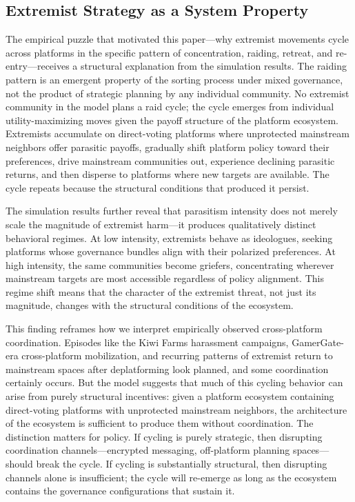 \documentclass{article}
\begin{document}
\subsection{Extremist Strategy as a System Property}

The empirical puzzle that motivated this paper---why extremist movements cycle across platforms in the specific pattern of concentration, raiding, retreat, and re-entry---receives a structural explanation from the simulation results. The raiding pattern is an emergent property of the sorting process under mixed governance, not the product of strategic planning by any individual community. No extremist community in the model plans a raid cycle; the cycle emerges from individual utility-maximizing moves given the payoff structure of the platform ecosystem. Extremists accumulate on direct-voting platforms where unprotected mainstream neighbors offer parasitic payoffs, gradually shift platform policy toward their preferences, drive mainstream communities out, experience declining parasitic returns, and then disperse to platforms where new targets are available. The cycle repeats because the structural conditions that produced it persist.

The simulation results further reveal that parasitism intensity does not merely scale the magnitude of extremist harm---it produces qualitatively distinct behavioral regimes. At low intensity, extremists behave as ideologues, seeking platforms whose governance bundles align with their polarized preferences. At high intensity, the same communities become griefers, concentrating wherever mainstream targets are most accessible regardless of policy alignment. This regime shift means that the character of the extremist threat, not just its magnitude, changes with the structural conditions of the ecosystem.

This finding reframes how we interpret empirically observed cross-platform coordination. Episodes like the Kiwi Farms harassment campaigns, GamerGate-era cross-platform mobilization, and recurring patterns of extremist return to mainstream spaces after deplatforming look planned, and some coordination certainly occurs. But the model suggests that much of this cycling behavior can arise from purely structural incentives: given a platform ecosystem containing direct-voting platforms with unprotected mainstream neighbors, the architecture of the ecosystem is sufficient to produce them without coordination. The distinction matters for policy. If cycling is purely strategic, then disrupting coordination channels---encrypted messaging, off-platform planning spaces---should break the cycle. If cycling is substantially structural, then disrupting channels alone is insufficient; the cycle will re-emerge as long as the ecosystem contains the governance configurations that sustain it.
\end{document}
